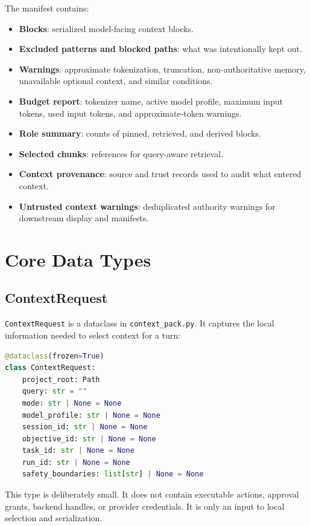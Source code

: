 \documentclass[11pt]{article}
\begin{document}
The manifest contains:

\begin{itemize}[leftmargin=*]
  \item \textbf{Blocks}: serialized model-facing context blocks.
  \item \textbf{Excluded patterns and blocked paths}: what was intentionally kept out.
  \item \textbf{Warnings}: approximate tokenization, truncation, non-authoritative memory, unavailable optional context, and similar conditions.
  \item \textbf{Budget report}: tokenizer name, active model profile, maximum input tokens, used input tokens, and approximate-token warnings.
  \item \textbf{Role summary}: counts of pinned, retrieved, and derived blocks.
  \item \textbf{Selected chunks}: references for query-aware retrieval.
  \item \textbf{Context provenance}: source and trust records used to audit what entered context.
  \item \textbf{Untrusted context warnings}: deduplicated authority warnings for downstream display and manifests.
\end{itemize}

\section{Core Data Types}

\subsection{ContextRequest}

\texttt{ContextRequest} is a dataclass in \texttt{context\_pack.py}. It captures the local information needed to select context for a turn:

\begin{lstlisting}[language=Python]
@dataclass(frozen=True)
class ContextRequest:
    project_root: Path
    query: str = ""
    mode: str | None = None
    model_profile: str | None = None
    session_id: str | None = None
    objective_id: str | None = None
    task_id: str | None = None
    run_id: str | None = None
    safety_boundaries: list[str] | None = None
\end{lstlisting}

This type is deliberately small. It does not contain executable actions, approval grants, backend handles, or provider credentials. It is only an input to local selection and serialization.
\end{document}
